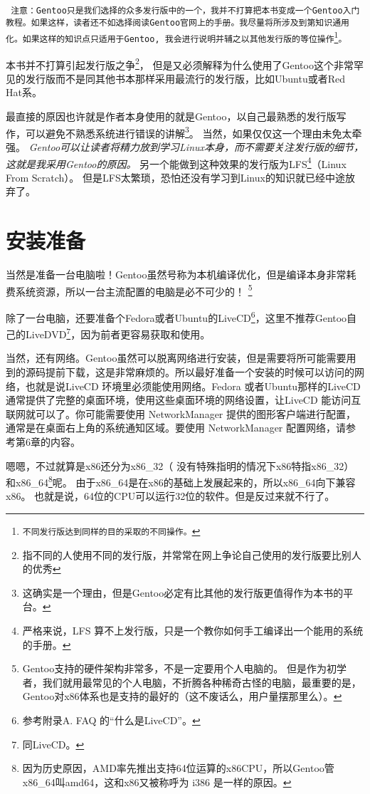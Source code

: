 \documentclass[amstex,twoside]{ctexbook}
\newenvironment{notice}{\tt}{}
\begin{document}
\begin{notice}
 注意：Gentoo只是我们选择的众多发行版中的一个，我并不打算把本书变成一个Gentoo入门教程。如果这样，读者还不如选择阅读Gentoo官网上的手册。我尽量将所涉及到第知识通用化。如果这样的知识点只适用于Gentoo, 我会进行说明并辅之以其他发行版的等位操作\footnote{不同发行版达到同样的目的采取的不同操作。}。
\end{notice}

本书并不打算引起发行版之争\footnote{指不同的人使用不同的发行版，并常常在网上争论自己使用的发行版要比别人的优秀}，
但是又必须解释为什么使用了Gentoo这个非常罕见的发行版而不是同其他书本那样采用最流行的发行版，比如Ubuntu或者Red Hat系。

最直接的原因也许就是作者本身使用的就是Gentoo，以自己最熟悉的发行版写作，可以避免不熟悉系统进行错误的讲解\footnote{这确实是一个理由，但是Gentoo必定有比其他的发行版更值得作为本书的平台。}。
当然，如果仅仅这一个理由未免太牵强。
{ \it Gentoo可以让读者将精力放到学习Linux本身，而不需要关注发行版的细节，这就是我采用Gentoo的原因。}
另一个能做到这种效果的发行版为LFS\footnote{严格来说，LFS 算不上发行版，只是一个教你如何手工编译出一个能用的系统的手册。}（Linux From Scratch）。
但是LFS太繁琐，恐怕还没有学习到Linux的知识就已经中途放弃了。


\section{安装准备}

当然是准备一台电脑啦！Gentoo虽然号称为本机编译优化，但是编译本身非常耗费系统资源，所以一台主流配置的电脑是必不可少的！
\footnote{Gentoo支持的硬件架构非常多，不是一定要用个人电脑的。
但是作为初学者，我们就用最常见的个人电脑，不折腾各种稀奇古怪的电脑，最重要的是，Gentoo对x86体系也是支持的最好的（这不废话么，用户量摆那里么）。}


除了一台电脑，还要准备个Fedora或者Ubuntu的LiveCD\footnote{参考附录A. FAQ 的“什么是LiveCD”。
}，这里不推荐Gentoo自己的LiveDVD\footnote{同LiveCD。}，因为前者更容易获取和使用。

当然，还有网络。Gentoo虽然可以脱离网络进行安装，但是需要将所可能需要用到的源码提前下载，这是非常麻烦的。所以最好准备一个安装的时候可以访问的网络，也就是说LiveCD 环境里必须能使用网络。Fedora 或者Ubuntu那样的LiveCD 通常提供了完整的桌面环境，使用这些桌面环境的网络设置，让LiveCD 能访问互联网就可以了。你可能需要使用 NetworkManager 提供的图形客户端进行配置，通常是在桌面右上角的系统通知区域。要使用 NetworkManager 配置网络，请参考第6章的内容。

嗯嗯，不过就算是x86还分为x86\_32（ 没有特殊指明的情况下x86特指x86\_32） 和x86\_64\footnote{因为历史原因，AMD率先推出支持64位运算的x86CPU，所以Gentoo管x86\_64叫amd64，这和x86又被称呼为 i386 是一样的原因。}呢。
由于x86\_64是在x86的基础上发展起来的，所以x86\_64向下兼容x86。 也就是说，64位的CPU可以运行32位的软件。但是反过来就不行了。
\end{document}
